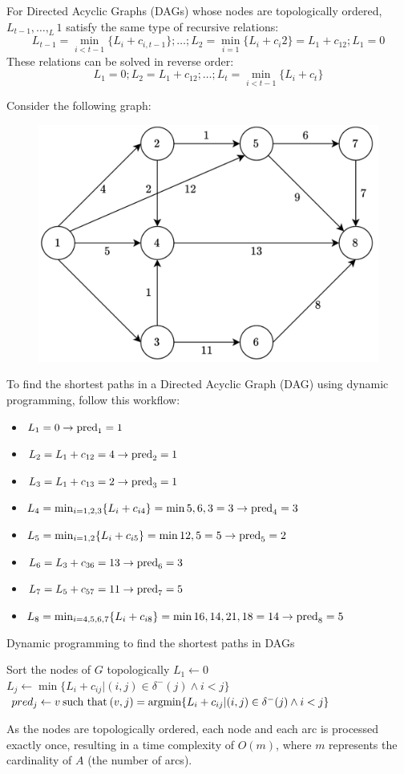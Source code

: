 For Directed Acyclic Graphs (DAGs) whose nodes are topologically ordered, $L_{t-1},\dots,_L1$ satisfy the same type of recursive relations:
\[L_{t-1}=\min_{i<t-1}\{L_i+c_{i,t-1}\};\dots;L_2=\min_{i=1}\{L_i+c_i2\}=L_1+c_{12};L_1=0\]
These relations can be solved in reverse order:
\[L_1=0;L_2=L_1+c_{12};\dots;L_{t}=\min_{i<t-1}\{L_i+c_{t}\}\]
\begin{example}
    Consider the following graph:
    \begin{figure}[H]
        \centering
        \includegraphics[width=0.4\linewidth]{images/DAG.png}
    \end{figure}
    To find the shortest paths in a Directed Acyclic Graph (DAG) using dynamic programming, follow this workflow:
    \begin{itemize}
        \item $L_1=0 \rightarrow \textnormal{pred}_1=1$
        \item $L_2=L_1+c_{12}=4 \rightarrow \textnormal{pred}_2=1$
        \item $L_3=L_1+c_{13}=2 \rightarrow \textnormal{pred}_3=1$
        \item $L_4=\min_{i=1,2,3}\{L_i+c_{i4}\}=\min{5,6,3}=3 \rightarrow \textnormal{pred}_4=3$
        \item $L_5=\min_{i=1,2}\{L_i+c_{i5}\}=\min{12,5}=5 \rightarrow \textnormal{pred}_5=2$
        \item $L_6=L_3+c_{36}=13 \rightarrow \textnormal{pred}_6=3$
        \item $L_7=L_5+c_{57}=11 \rightarrow \textnormal{pred}_7=5$
        \item $L_8=\min_{i=4,5,6,7}\{L_i+c_{i8}\}=\min{16,14,21,18}=14 \rightarrow \textnormal{pred}_8=5$
    \end{itemize}
\end{example}
\begin{algorithm}[H]
    \caption{Dynamic programming to find the shortest paths in DAGs}
        \begin{algorithmic}[1]
            \State Sort the nodes of $G$ topologically
            \State $L_1 \leftarrow 0$
                \State $L_j \leftarrow \min\{L_i+c_{ij}|(i,j) \in \delta^{-}(j) \land i < j\}$
                \State $pred_j \leftarrow v \: \textnormal{such that} \: (v,j)=\textnormal{argmin} \{L_i+c_{ij}|(i,j) \in \delta^{-}(j) \land i < j\}$
            \EndFor
        \end{algorithmic}
\end{algorithm}
As the nodes are topologically ordered, each node and each arc is processed exactly once, resulting in a time complexity of $O(m)$, where $m$ represents the cardinality of $A$ (the number of arcs).    

